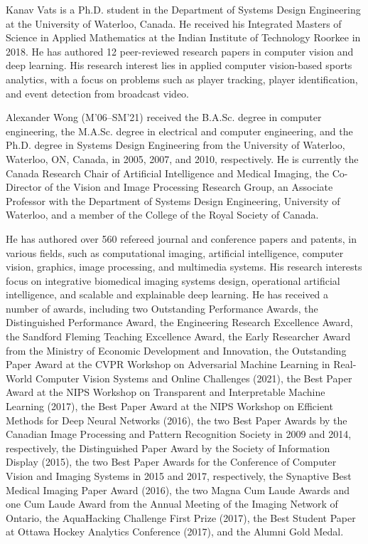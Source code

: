 \documentclass{ieeeaccess}
\begin{document}
\begin{IEEEbiography}{Kanav Vats} is a Ph.D. student in the Department of Systems Design Engineering at the University of Waterloo, Canada. He received his Integrated Masters of Science in Applied Mathematics at the Indian Institute of Technology Roorkee in 2018. He has authored 12 peer-reviewed research papers in computer vision and deep learning. His research interest lies in applied computer vision-based sports analytics, with a focus on problems such as player tracking, player identification, and event detection from broadcast video.
\end{IEEEbiography}

\begin{IEEEbiography}{Alexander Wong} (M’06–SM’21) received the B.A.Sc. degree in computer engineering, the M.A.Sc. degree in electrical and computer engineering, and the Ph.D. degree in Systems Design Engineering from the University of Waterloo, Waterloo, ON, Canada, in 2005, 2007, and 2010, respectively. He is currently the Canada Research Chair of Artificial Intelligence and Medical Imaging, the Co-Director of the Vision and Image Processing Research Group, an Associate Professor with the Department of Systems Design Engineering, University of Waterloo, and a member of the College of the Royal Society of Canada. 

He has authored over 560 refereed journal and conference papers and patents, in various fields, such as computational imaging, artificial intelligence, computer vision, graphics, image processing, and multimedia systems. His research interests focus on integrative biomedical imaging systems design, operational artificial intelligence, and scalable and explainable deep learning. He has received a number of awards, including two Outstanding Performance Awards, the Distinguished Performance Award, the Engineering Research Excellence Award, the Sandford Fleming Teaching Excellence Award, the Early Researcher Award from the Ministry of Economic Development and Innovation, the Outstanding Paper Award at the CVPR Workshop on Adversarial Machine Learning in Real-World Computer Vision Systems and Online Challenges (2021), the Best Paper Award at the NIPS Workshop on Transparent and Interpretable Machine Learning (2017), the Best Paper Award at the NIPS Workshop on Efficient Methods for Deep Neural Networks (2016), the two Best Paper Awards by the Canadian Image Processing and Pattern Recognition Society in 2009 and 2014, respectively, the Distinguished Paper Award by the Society of Information Display (2015), the two Best Paper Awards for the Conference of Computer Vision and Imaging Systems in 2015 and 2017, respectively, the Synaptive Best Medical Imaging Paper Award (2016), the two Magna Cum Laude Awards and one Cum Laude Award from the Annual Meeting of the Imaging Network of Ontario, the AquaHacking Challenge First Prize (2017), the Best Student Paper at Ottawa Hockey Analytics Conference (2017), and the Alumni Gold Medal.
\end{IEEEbiography}
\end{document}
